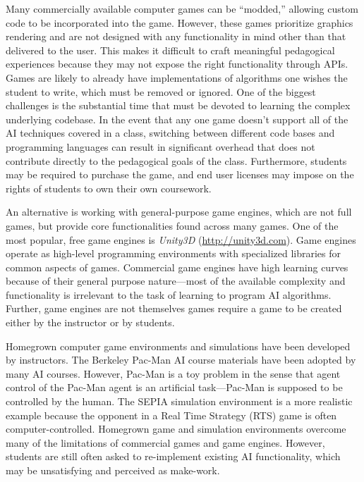 \documentclass[letterpaper]{article}
\begin{document}
Many commercially available computer games can be ``modded,'' allowing custom code to be incorporated into the game. 
However, these games prioritize graphics rendering and are not designed with any functionality in mind other than that delivered to the user.
This makes it difficult to craft meaningful pedagogical experiences because they may not expose the right functionality through APIs.
Games are likely to already have implementations of algorithms one wishes the student to write, which must be removed or ignored.
One of the biggest challenges is the substantial time that must be devoted to learning the complex underlying codebase.
In the event that any one game doesn't support all of the AI techniques covered in a class, switching between different code bases and programming languages can result in significant overhead that does not contribute directly to the pedagogical goals of the class.
Furthermore, students may be required to purchase the game, and end user licenses may impose on the rights of students to own their own coursework.

An alternative is working with general-purpose game engines, which are not full games, but provide core functionalities found across many games.
One of the most popular, free game engines is {\em Unity3D} (\url{http://unity3d.com}).
Game engines operate as high-level programming environments with specialized libraries for common aspects of games.
Commercial game engines have high learning curves because of their general purpose nature---most of the available complexity and functionality is irrelevant to the task of learning to program AI algorithms.
Further, game engines are not themselves games require a game to be created either by the instructor or by students.



Homegrown computer game environments and simulations have been developed by instructors.
The Berkeley Pac-Man AI course materials have been adopted by many AI courses.
However, Pac-Man is a toy problem in the sense that agent control of the Pac-Man agent is an artificial task---Pac-Man is supposed to be controlled by the human. 
The SEPIA simulation environment \cite{sosnowski13} is a more realistic example because the opponent in a Real Time Strategy (RTS) game is often computer-controlled.
Homegrown game and simulation environments overcome many of the limitations of commercial games and game engines.
However, students are still often asked to re-implement existing AI functionality, which may be unsatisfying and perceived as make-work.
\end{document}
